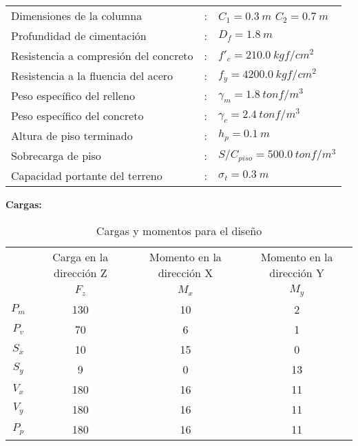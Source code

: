 \documentclass{article}%
\begin{document}
\begin{table}[h!]
    \centering
    \begin{tabular}{lcl} %
        Dimensiones de la columna               &:& $C_1        = 0.3~m$ \quad $C_2 = 0.7~m$\\
        Profundidad de cimentación              &:& $D_f        = 1.8~m$\\
        Resistencia a compresión del concreto   &:& $f'_c       =  210.0~kgf/cm^2 $ \\
        Resistencia a la fluencia del acero     &:& $f_y        =  4200.0~kgf/cm^2$ \\
        Peso específico del relleno             &:& $\gamma_m   =  1.8~tonf/m^3 $ \\
        Peso específico del concreto            &:& $\gamma_c   =  2.4~tonf/m^3 $ \\
        Altura de piso terminado                &:& $h_p        = 0.1~m$\\
        Sobrecarga de piso                      &:& $S/C_{piso} = 500.0~tonf/m^3$ \\ 
        Capacidad portante del terreno          &:& $\sigma_t  = 0.3~m$  \\
    \end{tabular}
\end{table}

\textbf{Cargas:}


\begin{table}[h!]
    \centering
    \begin{tabular}{cccc} \toprule
         & Carga en la dirección Z & Momento en la dirección X & Momento en la dirección Y  \\ 
         & $F_z$ & $M_x $ & $M_y$ \\ \midrule
        $P_m$ & 130& 10 & 2 \\
        $P_v$ & 70 & 6 & 1 \\
        $S_x$ & 10 & 15 & 0 \\
        $S_y$ & 9 & 0 & 13 \\
        $V_x$ & 180 & 16 & 11 \\
        $V_y$ & 180 & 16 & 11 \\
        $P_p$ & 180 & 16 & 11 \\\bottomrule
    \end{tabular}
    \caption{Cargas y momentos para el diseño}
    \label{tab:my_label}
\end{table}
\end{document}
